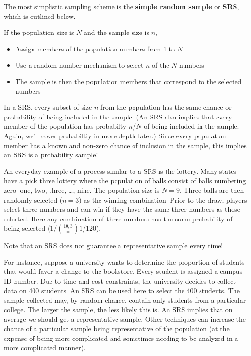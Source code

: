 \documentclass[
]{book}
\providecommand{\tightlist}{%
  \setlength{\itemsep}{0pt}\setlength{\parskip}{0pt}}
\theoremstyle{definition}
\theoremstyle{definition}
\theoremstyle{definition}
\theoremstyle{remark}
\begin{document}
The most simplistic sampling scheme is the \textbf{simple random sample} or \textbf{SRS}, which is outlined below.

If the population size is \(N\) and the sample size is \(n\),

\begin{itemize}
\tightlist
\item
  Assign members of the population numbers from 1 to \(N\)\\
\item
  Use a random number mechanism to select \(n\) of the \(N\) numbers\\
\item
  The sample is then the population members that correspond to the selected numbers
\end{itemize}

In a SRS, every subset of size \(n\) from the population has the same chance or probability of being included in the sample. (An SRS also implies that every member of the population has probabilty \(n/N\) of being included in the sample. Again, we'll cover probabiltiy in more depth later.) Since every population member has a known and non-zero chance of inclusion in the sample, this implies an SRS is a probability sample!

An everyday example of a process similar to a SRS is the lottery. Many states have a pick three lottery where the population of balls consist of balls numbering zero, one, two, three, \ldots{}, nine. The population size is \(N=9\). Three balls are then randomly selected (\(n=3\)) as the winning combination. Prior to the draw, players select three numbers and can win if they have the same three numbers as those selected. Here any combination of three numbers has the same probability of being selected (\(1/\binom{10,3} = 1/120\)).

Note that an SRS does not guarantee a representative sample every time!

For instance, suppose a university wants to determine the proportion of students that would favor a change to the bookstore. Every student is assigned a campus ID number. Due to time and cost constraints, the university decides to collect data on 400 students. An SRS can be used here to select the 400 students. The sample collected may, by random chance, contain only students from a particular college. The larger the sample, the less likely this is. An SRS implies that on average we should get a representative sample. Other techniques can increase the chance of a particular sample being representative of the population (at the expense of being more complicated and sometimes needing to be analyzed in a more complicated manner).
\end{document}

